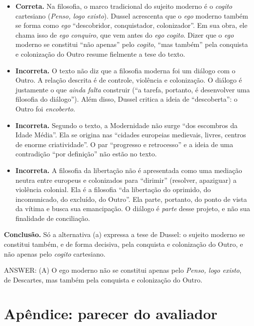 \documentclass{article}%
\begin{document}
\begin{itemize}
\item[(a)] \textbf{Correta.} Na filosofia, o marco tradicional do sujeito moderno é o \textit{cogito} cartesiano (\textit{Penso, logo existo}). Dussel acrescenta que o \emph{ego} moderno também se forma como \emph{ego} ``descobridor, conquistador, colonizador''. Em sua obra, ele chama isso de \textit{ego conquiro}, que vem antes do \textit{ego cogito}. Dizer que o \emph{ego} moderno se constitui ``não apenas'' pelo \textit{cogito}, ``mas também'' pela conquista e colonização do Outro resume fielmente a tese do texto.

\item[(b)] \textbf{Incorreta.} O texto não diz que a filosofia moderna foi um diálogo com o Outro. A relação descrita é de controle, violência e colonização. O diálogo é justamente o que \emph{ainda falta} construir (``a tarefa, portanto, é desenvolver uma filosofia do diálogo''). Além disso, Dussel critica a ideia de ``descoberta'': o Outro foi \emph{encoberto}.

\item[(c)] \textbf{Incorreta.} Segundo o texto, a Modernidade não surge ``dos escombros da Idade Média''. Ela se origina nas ``cidades europeias medievais, livres, centros de enorme criatividade''. O par ``progresso e retrocesso'' e a ideia de uma contradição ``por definição'' não estão no texto.

\item[(d)] \textbf{Incorreta.} A filosofia da libertação não é apresentada como uma mediação neutra entre europeus e colonizados para ``dirimir'' (resolver, apaziguar) a violência colonial. Ela é a filosofia ``da libertação do oprimido, do incomunicado, do excluído, do Outro''. Ela parte, portanto, do ponto de vista da vítima e busca sua emancipação. O diálogo é \emph{parte} desse projeto, e não sua finalidade de conciliação.
\end{itemize}

\textbf{Conclusão.} Só a alternativa (a) expressa a tese de Dussel: o sujeito moderno se constitui também, e de forma decisiva, pela conquista e colonização do Outro, e não apenas pelo \textit{cogito} cartesiano.

\medskip
ANSWER: (A) O ego moderno não se constitui apenas pelo \textit{Penso, logo existo}, de Descartes, mas também pela conquista e colonização do Outro.%
\newpage%
\section*{Apêndice: parecer do avaliador}%
\end{document}
